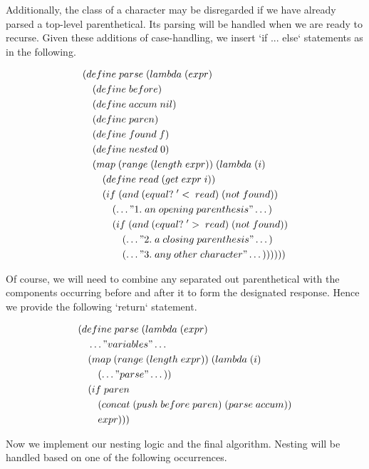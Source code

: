 Additionally, the class of a character may be disregarded if we have already parsed a 
top-level parenthetical. Its parsing will be handled when we are ready to recurse. Given 
these additions of case-handling, we insert `if ... else` statements as in the following.

\begin{align*}
& (define \; parse \; (lambda \; (expr) \; 
\\& \quad (define \; before)
\\& \quad (define \; accum \; nil)
\\& \quad (define \; paren)
\\& \quad (define \; found \; f)
\\& \quad (define \; nested \; 0)
\\& \quad (map \; (range \; (length \; expr)) \; (lambda \; (i)
\\& \qquad (define \; read \; (get \; expr \; i))
\\& \qquad (if \; (and \; (equal? \; '< \; read) \; (not \; found))
\\& \qquad \quad (\dots"1. \; an \; opening \; parenthesis"\dots)
\\& \qquad \quad (if \; (and \; (equal? \; '> \; read) \; (not \; found))
\\& \qquad \qquad (\dots"2. \; a \; closing \; parenthesis"\dots)
\\& \qquad \qquad (\dots"3. \; any \; other \; character"\dots))))))
\end{align*}

Of course, we will need to combine any separated out parenthetical with the components 
occurring before and after it to form the designated response. Hence we provide the 
following `return` statement.

\begin{align*}
& (define \; parse \; (lambda \; (expr) \; 
\\& \quad \dots"variables"\dots
\\& \quad (map \; (range \; (length \; expr)) \; (lambda \; (i)
\\& \qquad (\dots"parse"\dots))
\\& \quad (if \; paren
\\& \qquad (concat \; (push \; before \; paren) \; (parse \; accum))
\\& \qquad expr)))
\end{align*}

Now we implement our nesting logic and the final algorithm. Nesting will be handled 
based on one of the following occurrences.

